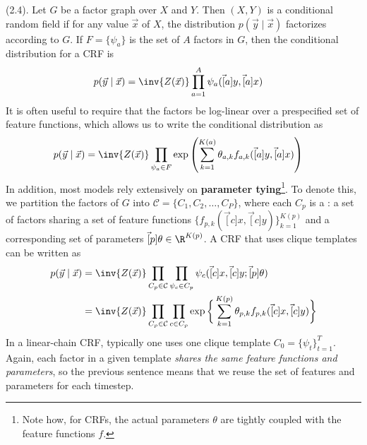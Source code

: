 \documentclass[11pt]{article}
\begin{document}
\myspace
\p {} (2.4). Let $G$ be a factor graph over $X$ and $Y$. Then $(X, Y)$ is a conditional random field if for any value $\vec{x}$ of $X$, the distribution $p(\vec{y} \mid \vec{x})$ factorizes according to $G$. If $F = \{\psi_a\}$ is the set of $A$ factors in $G$, then the conditional distribution for a CRF is
\begin{align}
p(\vec{y} \mid \vec{x}) &= \inv{Z(\vec{x})} \prod_{a = 1}^{A} \psi_a(\vec[a]{y}, \vec[a]{x})
\end{align}
It is often useful to require that the factors be log-linear over a prespecified set of feature functions, which allows us to write the conditional distribution as
\begin{align}
p(\vec{y} \mid \vec{x}) &= \inv{Z(\vec{x})} \prod_{\psi_a \in F}
\exp\left( \sum_{k =1}^{K(a)}  \theta_{a,k}f_{a,k}(\vec[a]{y}, \vec[a]{x} ) \right)
\end{align}
In addition, most models rely extensively on \textbf{parameter tying}\footnote{Note how, for CRFs, the actual parameters $\theta$ are tightly coupled with the feature functions $f$.}. To denote this, we partition the factors of $G$ into $\mathcal{C} = \{C_1, C_2, \ldots, C_P\}$, where each $C_p$ is a : a set of factors sharing a set of feature functions $\{f_{p,k}(\vec[c]{x}, \vec[c]{y})\}_{k=1}^{K(p)}$ and a corresponding set of parameters $\vec[p]{\theta} \in \R^{K(p)}$. A CRF that uses clique templates can be written as 
\begin{align}
p(\vec{y} \mid \vec{x}) &= \inv{Z(\vec x)} \prod_{C_p \in \mathcal{C}} \prod_{\psi_c \in C_p} \psi_c(\vec[c]{x}, \vec[c]{y}; \vec[p]{\theta}) \\
&= \inv{Z(\vec x)} \prod_{C_p \in \mathcal{C}} \prod_{c \in C_p}
\exp\bigg\{ \sum_{k = 1}^{K(p)} \theta_{p,k}f_{p,k}(\vec[c]{x}, \vec[c]{y}) \bigg\}
\end{align}
In a linear-chain CRF, typically one uses one clique template $C_0 = \{\psi_t\}_{t=1}^{T}$. Again, each factor in a given template \textit{shares the same feature functions and parameters}, so the previous sentence means that we reuse the set of features and parameters for each timestep. 
\end{document}
